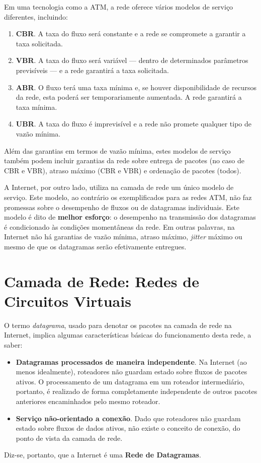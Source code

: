 \documentclass{article}
\begin{document}
Em uma tecnologia como a ATM, a rede oferece vários modelos de serviço diferentes, incluindo:
\begin{enumerate}
    \item \textbf{CBR}. A taxa do fluxo será constante e a rede se compromete a garantir a taxa solicitada.
    \item \textbf{VBR}. A taxa do fluxo será variável --- dentro de determinados parâmetros previsíveis --- e a rede garantirá a taxa solicitada.
    \item \textbf{ABR}. O fluxo terá uma taxa mínima e, se houver disponibilidade de recursos da rede, esta poderá ser temporariamente aumentada. A rede garantirá a taxa mínima.
    \item \textbf{UBR}. A taxa do fluxo é imprevisível e a rede não promete qualquer tipo de vazão mínima.
\end{enumerate}
Além das garantias em termos de vazão mínima, estes modelos de serviço também podem incluir garantias da rede sobre entrega de pacotes (no caso de CBR e VBR), atraso máximo (CBR e VBR) e ordenação de pacotes (todos).

A Internet, por outro lado, utiliza na camada de rede um único modelo de serviço. Este modelo, ao contrário os exemplificados para as redes ATM, não faz promessas sobre o desempenho de fluxos ou de datagramas individuais. Este modelo é dito de \textbf{melhor esforço}: o desempenho na transmissão dos datagramas é condicionado às condições momentâneas da rede. Em outras palavras, na Internet não há garantias de vazão mínima, atraso máximo, \textit{jitter} máximo ou mesmo de que os datagramas serão efetivamente entregues.

\section{Camada de Rede: Redes de Circuitos Virtuais}

O termo \textit{datagrama}, usado para denotar os pacotes na camada de rede na Internet, implica algumas características básicas do funcionamento desta rede, a saber:
\begin{itemize}
    \item \textbf{Datagramas processados de maneira independente}. Na Internet (ao menos idealmente), roteadores não guardam estado sobre fluxos de pacotes ativos. O processamento de um datagrama em um roteador intermediário, portanto, é realizado de forma completamente independente de outros pacotes anteriores encaminhados pelo mesmo roteador.
    \item \textbf{Serviço não-orientado a conexão}. Dado que roteadores não guardam estado sobre fluxos de dados ativos, não existe o conceito de conexão, do ponto de vista da camada de rede.
\end{itemize}
Diz-se, portanto, que a Internet é uma \textbf{Rede de Datagramas}.
\end{document}
